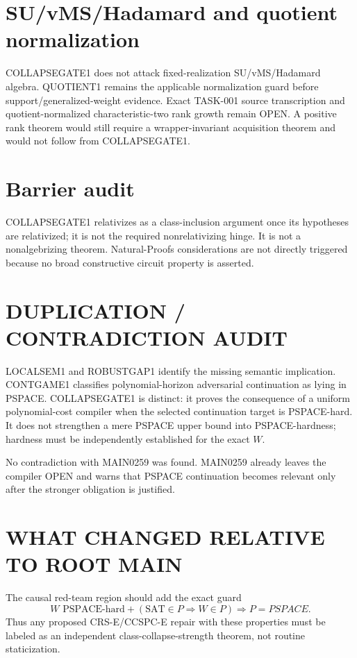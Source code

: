 \documentclass[11pt]{article}
\begin{document}
\section*{SU/vMS/Hadamard and quotient normalization}
COLLAPSEGATE1 does not attack fixed-realization SU/vMS/Hadamard algebra. QUOTIENT1 remains the applicable normalization guard before support/generalized-weight evidence. Exact TASK-001 source transcription and quotient-normalized characteristic-two rank growth remain OPEN. A positive rank theorem would still require a wrapper-invariant acquisition theorem and would not follow from COLLAPSEGATE1.

\section*{Barrier audit}
COLLAPSEGATE1 relativizes as a class-inclusion argument once its hypotheses are relativized; it is not the required nonrelativizing hinge. It is not a nonalgebrizing theorem. Natural-Proofs considerations are not directly triggered because no broad constructive circuit property is asserted.

\section*{DUPLICATION / CONTRADICTION AUDIT}
LOCALSEM1 and ROBUSTGAP1 identify the missing semantic implication. CONTGAME1 classifies polynomial-horizon adversarial continuation as lying in PSPACE. COLLAPSEGATE1 is distinct: it proves the consequence of a uniform polynomial-cost compiler when the selected continuation target is PSPACE-hard. It does not strengthen a mere PSPACE upper bound into PSPACE-hardness; hardness must be independently established for the exact \(W\).

No contradiction with MAIN0259 was found. MAIN0259 already leaves the compiler OPEN and warns that PSPACE continuation becomes relevant only after the stronger obligation is justified.

\section*{WHAT CHANGED RELATIVE TO ROOT MAIN}
The causal red-team region should add the exact guard
\[
\boxed{
W\text{ PSPACE-hard}+
(\mathrm{SAT}\in P\Rightarrow W\in P)
\Longrightarrow P=PSPACE.
}
\]
Thus any proposed CRS-E/CCSPC-E repair with these properties must be labeled as an independent class-collapse-strength theorem, not routine staticization.
\end{document}
